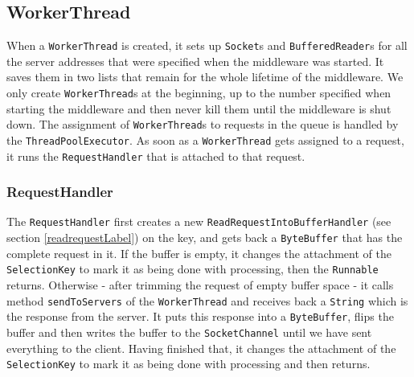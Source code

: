 \documentclass[11pt,a4paper]{article}
\newcommand{\co}[1]{\texttt{#1}}
\begin{document}
\subsection{WorkerThread}
When a \co{WorkerThread} is created, it sets up \co{Socket}s and \co{BufferedReader}s for all the server addresses that were specified when the middleware was started. It saves them in two lists that remain for the whole lifetime of the middleware. We only create \co{WorkerThread}s at the beginning, up to the number specified when starting the middleware and then never kill them until the middleware is shut down. The assignment of \co{WorkerThread}s to requests in the queue is handled by the \co{ThreadPoolExecutor}. As soon as a \co{WorkerThread} gets assigned to a request, it runs the \co{RequestHandler} that is attached to that request. 

\subsubsection{RequestHandler}
The \co{RequestHandler} first creates a new \co{ReadRequestIntoBufferHandler} (see section \ref{readrequestLabel}) on the key, and gets back a \co{ByteBuffer} that has the complete request in it. If the buffer is empty, it changes the attachment of the \co{SelectionKey} to mark it as being done with processing, then the \co{Runnable} returns. Otherwise - after trimming the request of empty buffer space - it calls method \co{sendToServers} of the \co{WorkerThread} and receives back a \co{String} which is the response from the server. It puts this response into a \co{ByteBuffer}, flips the buffer and then writes the buffer to the \co{SocketChannel} until we have sent everything to the client. Having finished that, it changes the attachment of the \co{SelectionKey} to mark it as being done with processing and then returns.
\end{document}
